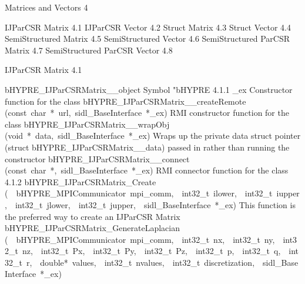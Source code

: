 \documentclass{article}
\begin{document}
\begin{cxxentry}
{}
        {Matrices and Vectors}
        {}
        {
}
        {4}
\begin{cxxnames}
\cxxitem{}
        {IJParCSR Matrix}
        {}
        {
}
        {4.1}
\cxxitem{}
        {IJParCSR Vector}
        {}
        {
}
        {4.2}
\cxxitem{}
        {Struct Matrix}
        {}
        {
}
        {4.3}
\cxxitem{}
        {Struct Vector}
        {}
        {
}
        {4.4}
\cxxitem{}
        {SemiStructured Matrix}
        {}
        {
}
        {4.5}
\cxxitem{}
        {SemiStructured Vector}
        {}
        {
}
        {4.6}
\cxxitem{}
        {SemiStructured ParCSR Matrix}
        {}
        {
}
        {4.7}
\cxxitem{}
        {SemiStructured ParCSR Vector}
        {}
        {
}
        {4.8}
\end{cxxnames}
\begin{cxxentry}
{}
        {IJParCSR Matrix}
        {}
        {
}
        {4.1}
\begin{cxxnames}
        {bHYPRE\_IJParCSRMatrix\_\_object}
        {}
        {
Symbol "bHYPRE}
        {4.1.1}
        {\_ex}
        {}
        {
Constructor function for the class}
        {}
\label{cxx.4.1.16}
        {bHYPRE\_IJParCSRMatrix\_\_createRemote}
        {(const\ char\ *\ url,\ sidl\_BaseInterface\ *\_ex)}
        {
RMI constructor function for the class}
        {}
\label{cxx.4.1.17}
        {bHYPRE\_IJParCSRMatrix\_\_wrapObj}
        {(void\ *\ data,\ sidl\_BaseInterface\ *\_ex)}
        {
Wraps up the private data struct pointer (struct bHYPRE\_IJParCSRMatrix\_\_data) passed in rather than running the constructor}
        {}
\label{cxx.4.1.18}
        {bHYPRE\_IJParCSRMatrix\_\_connect}
        {(const\ char\ *,\ sidl\_BaseInterface\ *\_ex)}
        {
RMI connector function for the class}
        {4.1.2}
        {bHYPRE\_IJParCSRMatrix\_Create}
        {(\ \ bHYPRE\_MPICommunicator\ mpi\_comm,\ \ int32\_t\ ilower,\ \ int32\_t\ iupper,\ \ int32\_t\ jlower,\ \ int32\_t\ jupper,\ \ sidl\_BaseInterface\ *\_ex)}
        {
This function is the preferred way to create an IJParCSR Matrix}
        {}
\label{cxx.4.1.19}
        {bHYPRE\_IJParCSRMatrix\_GenerateLaplacian}
        {(\ \ bHYPRE\_MPICommunicator\ mpi\_comm,\ \ int32\_t\ nx,\ \ int32\_t\ ny,\ \ int32\_t\ nz,\ \ int32\_t\ Px,\ \ int32\_t\ Py,\ \ int32\_t\ Pz,\ \ int32\_t\ p,\ \ int32\_t\ q,\ \ int32\_t\ r,\ \ double*\ values,\ \ int32\_t\ nvalues,\ \ int32\_t\ discretization,\ \ sidl\_BaseInterface\ *\_ex)}

\end{cxxnames}
\end{cxxentry}
\end{cxxentry}
\end{document}
